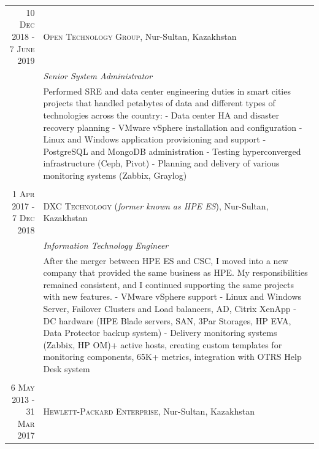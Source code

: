 \documentclass[a4paper,10pt]{article}
\begin{document}
\begin{longtable}{r|p{11cm}}
\textsc{10 Dec 2018 - 7 June 2019} & \textsc{Open Technology Group}, Nur-Sultan, Kazakhstan \\
                                   & \emph{Senior System Administrator}\\
& \footnotesize{\textnormal{Performed SRE and data center engineering duties in smart cities projects that handled petabytes 
of data and different types of technologies across the country:\newline
- Data center HA and disaster recovery planning\newline
- VMware vSphere installation and configuration\newline
- Linux and Windows application provisioning and support\newline
- PostgreSQL and MongoDB administration\newline
- Testing hyperconverged infrastructure (Ceph, Pivot)\newline
- Planning and delivery of various monitoring systems (Zabbix, Graylog)}}\\
\multicolumn{2}{c}{} \\
\textsc{1 Apr 2017 - 7 Dec 2018} & \textsc{DXC Technology} (\emph{former known as HPE ES}), Nur-Sultan, Kazakhstan \\
                                 & \emph{Information Technology Engineer}\\
& \footnotesize{\textnormal{After the merger between HPE ES and CSC, I moved into a new company that provided the same business as HPE. My responsibilities remained consistent, and I continued supporting the same projects with new features.\newline
- VMware vSphere support\newline
- Linux and Windows Server, Failover Clusters and Load balancers, AD, Citrix XenApp\newline
- DC hardware (HPE Blade servers, SAN, 3Par Storages, HP EVA, Data Protector backup system)\newline
- Delivery monitoring systems (Zabbix, HP OM)\newline
70+ active hosts, creating custom templates for monitoring components, 65K+ metrics, integration with OTRS Help Desk system}}\\
\multicolumn{2}{c}{} \\
\textsc{6 May 2013 - 31 Mar 2017} & \textsc{Hewlett-Packard Enterprise}, Nur-Sultan, Kazakhstan \\

\end{longtable}
\end{document}
